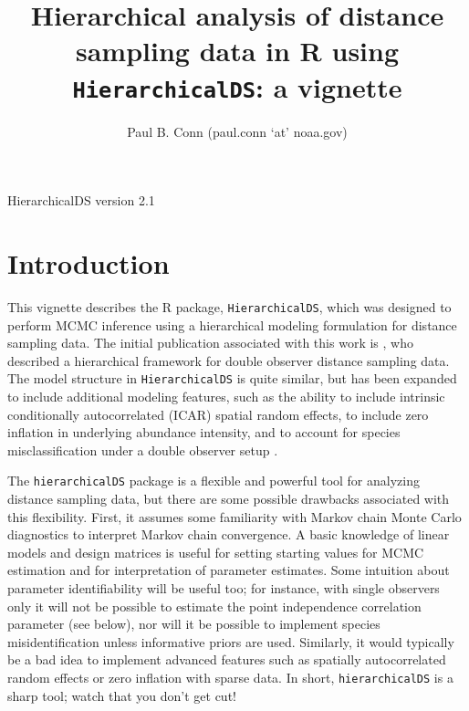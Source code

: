 \documentclass{article}\usepackage{graphicx, color}
\newcommand{\version}{2.1}
\begin{document}
\title{Hierarchical analysis of distance sampling data in R using \texttt{HierarchicalDS}: a vignette}
\author{Paul B. Conn (paul.conn `at' noaa.gov)}
\maketitle
\begin{center}
HierarchicalDS version \version
\end{center}
\tableofcontents
\clearpage




\section{Introduction}

This vignette describes the R package, \texttt{HierarchicalDS}, which was designed to perform
MCMC inference using a hierarchical modeling formulation for distance sampling data.  The initial
publication associated with this work is \citet{ConnEtAl2012}, who described a hierarchical framework
for double observer distance sampling data.  The model structure in \texttt{HierarchicalDS} is quite
similar, but has been expanded to include additional modeling features, such as the ability to include intrinsic 
conditionally autocorrelated (ICAR) spatial random effects, to include zero inflation in underlying abundance intensity,
and to account for species misclassification under a double observer setup \citep[see e.g.][]{ConnEtAl2013}.

The \texttt{hierarchicalDS} package is a flexible and powerful tool for analyzing distance sampling data, but there are some possible drawbacks associated with this flexibility.  First, it assumes some familiarity with Markov chain Monte Carlo \citep[MCMC;][]{GelmanEtAl2004} diagnostics to interpret Markov chain convergence. A basic knowledge of linear models and design matrices is useful for setting starting values for MCMC estimation and for interpretation of parameter estimates.  Some intuition about parameter identifiability will be useful too; for instance, with single observers only it will not be possible to estimate the point independence correlation parameter (see below), nor will it be possible to implement species misidentification unless informative priors are used.  Similarly, it would typically be a bad idea to implement advanced features such as spatially autocorrelated random effects or zero inflation with sparse data.  In short, \texttt{hierarchicalDS} is a sharp tool; watch that you don't get cut!
\end{document}
